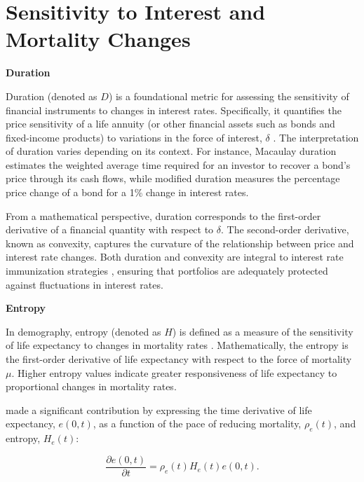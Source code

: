 \documentclass[12pt]{article}
\begin{document}
\section{Sensitivity to Interest and Mortality Changes}\label{sec:SensitivityMortalityInterest}

\textbf{Duration}

Duration (denoted as $D$) is a foundational metric for assessing the sensitivity of financial instruments to changes in interest rates. Specifically, it quantifies the price sensitivity of a life annuity (or other financial assets such as bonds and fixed-income products) to variations in the force of interest, $\delta$ \citep{milevsky2013life,charupat2016sluggish}. The interpretation of duration varies depending on its context. For instance, Macaulay duration estimates the weighted average time required for an investor to recover a bond's price through its cash flows, while modified duration measures the percentage price change of a bond for a 1\% change in interest rates.

From a mathematical perspective, duration corresponds to the first-order derivative of a financial quantity with respect to $\delta$. The second-order derivative, known as convexity, captures the curvature of the relationship between price and interest rate changes. Both duration and convexity are integral to interest rate immunization strategies \citep{redington1951papers,fisher1971coping,shiu1990redington,santomero1997financial,courtois2007immunization}, ensuring that portfolios are adequately protected against fluctuations in interest rates.

\textbf{Entropy}

In demography, entropy (denoted as $H$) is defined as a measure of the sensitivity of life expectancy to changes in mortality rates \citep{leser1955variations,keyfitz1977difference,demetrius1974demographic,goldman1986new, aburto2019threshold}. Mathematically, the entropy is the first-order derivative of life expectancy with respect to the force of mortality $\mu$. Higher entropy values indicate greater responsiveness of life expectancy to proportional changes in mortality rates.

\citet{Vaupel2003} made a significant contribution by expressing the time derivative of life expectancy, $e(0, t)$, as a function of the pace of reducing mortality, $\rho_e(t)$, and entropy, $H_e(t)$:

\begin{equation}\label{eq:lifeexpdecomp}
	\dfrac{\partial e(0,t)}{\partial t} = \rho_e(t) H_e(t) e(0,t).
\end{equation}
\end{document}
